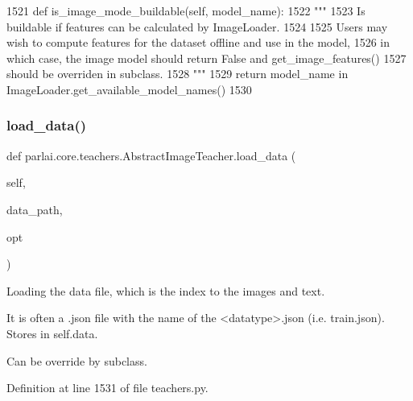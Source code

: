 \begin{DoxyCode}
1521     \textcolor{keyword}{def }is\_image\_mode\_buildable(self, model\_name):
1522         \textcolor{stringliteral}{"""}
1523 \textcolor{stringliteral}{        Is buildable if features can be calculated by ImageLoader.}
1524 \textcolor{stringliteral}{}
1525 \textcolor{stringliteral}{        Users may wish to compute features for the dataset offline and use in the model,}
1526 \textcolor{stringliteral}{        in which case, the image model should return False and get\_image\_features()}
1527 \textcolor{stringliteral}{        should be overriden in subclass.}
1528 \textcolor{stringliteral}{        """}
1529         \textcolor{keywordflow}{return} model\_name \textcolor{keywordflow}{in} ImageLoader.get\_available\_model\_names()
1530 
\end{DoxyCode}
\mbox{\label{classparlai_1_1core_1_1teachers_1_1AbstractImageTeacher_ad110a80a077e9e1135d4241083786199}} 
\subsubsection{\texorpdfstring{load\+\_\+data()}{load\_data()}}
{\footnotesize\ttfamily def parlai.\+core.\+teachers.\+Abstract\+Image\+Teacher.\+load\+\_\+data (\begin{DoxyParamCaption}\item[{}]{self,  }\item[{}]{data\+\_\+path,  }\item[{}]{opt }\end{DoxyParamCaption})}

\begin{DoxyVerb}Loading the data file, which is the index to the images and text.

It is often a .json file with the name of the <datatype>.json (i.e.
train.json). Stores in self.data.

Can be override by subclass.
\end{DoxyVerb}
 

Definition at line 1531 of file teachers.\+py.


